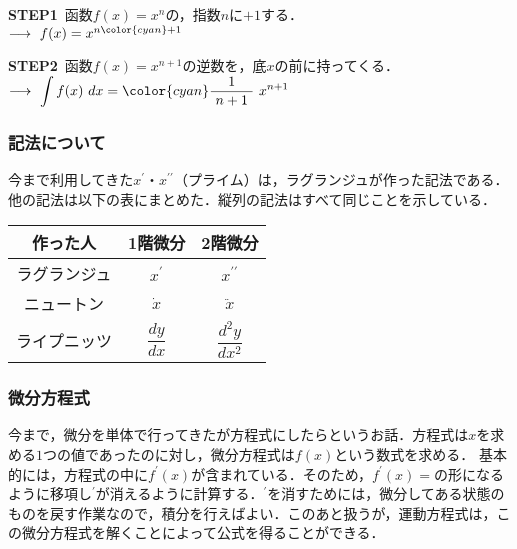 \documentclass[a4paper,11pt]{ltjsarticle}
\begin{document}

\textbf{STEP1}\ 函数$f(x)=x^{n}$の，指数$n$に$+1$する．\\
 $\longrightarrow\ f(x)=x^{n{\color{cyan} +1}}$


\textbf{STEP2}\ 函数$f(x)=x^{n+1}$の逆数を，底$x$の前に持ってくる．\\
 $\longrightarrow\ \displaystyle{\int f(x)\ dx={\color{cyan} \dfrac{1}{\ n+1\ }}\ x^{n+1}}$

\subsubsection{記法について}


今まで利用してきた$x^{\prime}$・$x^{\prime \prime}$（プライム）は，ラグランジュが作った記法である．他の記法は以下の表にまとめた．縦列の記法はすべて同じことを示している．


\begin{table}[hb]
  \centering
  \begin{tabular}{ccc}
    \hline
      作った人     & 1階微分          & 2階微分 \\
    \hline
      ラグランジュ & $x^{\prime}$     & $x^{\prime \prime}$ \\
      ニュートン   & $\dot{x}$        & $\ddot{x}$ \\
      ライプニッツ & $\dfrac{dy}{dx}$ & $\dfrac{d^2y}{dx^2}$ \\
    \hline
  \end{tabular}
\end{table}

\clearpage

\subsubsection{微分方程式}


今まで，微分を単体で行ってきたが方程式にしたらというお話．方程式は$x$を求める$1$つの値であったのに対し，微分方程式は$f(x)$という数式を求める．
基本的には，方程式の中に$f^{\prime}(x)$が含まれている．そのため，$f^{\prime}(x)=$の形になるように移項し$^\prime$が消えるように計算する．$^\prime$を消すためには，微分してある状態のものを戻す作業なので，積分を行えばよい．このあと扱うが，運動方程式は，この微分方程式を解くことによって公式を得ることができる．
\end{document}
